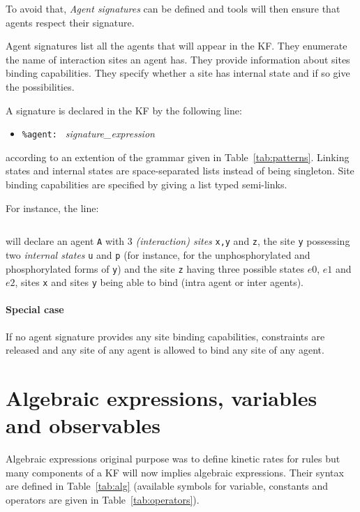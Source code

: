 \documentclass[11pt]{book}
\def\ttt#1{\texttt{#1}}
\def\ITE#1{\begin{itemize}#1\end{itemize}}
\begin{document}
To avoid that, \emph{Agent signatures} can be
defined and tools will then ensure that agents respect their
signature.

Agent signatures list all the agents that will appear in the
KF. They enumerate the name of interaction sites
an agent has. They provide information about sites binding capabilities.
They specify whether a site has internal state and if so give the possibilities.

A signature is declared in the
KF by the following line: \ITE{
\item[] \ttt{\%agent: } \textit{signature\_expression} } according to
an extention of the grammar given in Table~\ref{tab:patterns}. Linking
states and internal states are space-separated lists instead of being
singleton. Site binding capabilities are specified by giving a list
typed semi-links.

For instance, the line:
\begin{lstlisting}[language=kappa]
%agent: A(x[y.A], y{u p}[x.A], z{e0 e1 e2}) // Signature of agent A
\end{lstlisting}
will declare an agent \ttt{A} with 3 \emph{(interaction) sites}
\ttt{x,y} and \ttt{z}, the site \ttt{y} possessing two \emph{internal
  states} \ttt{u} and \ttt{p} (for instance, for
the unphosphorylated and phosphorylated forms of \ttt{y}) and the site
\ttt{z} having three possible states $e0$, $e1$ and $e2$, sites
\ttt{x} and sites \ttt{y} being able to bind (intra agent or inter
agents).

\paragraph{Special case} If no agent signature provides any site binding capabilities,
constraints are released and any site of any agent is allowed to bind
any site of any agent.

\section{Algebraic expressions, variables and observables}\label{sec:var}

Algebraic expressions original purpose was
to define kinetic rates for rules but many
components of a KF will now implies algebraic
expressions. Their syntax are defined in Table~\ref{tab:alg}
(available symbols for variable, constants and operators are given in
Table~\ref{tab:operators}).
\end{document}
